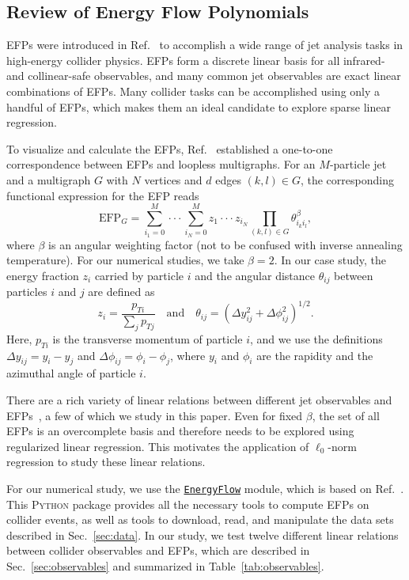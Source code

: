\documentclass[aps,prd,twocolumn, superscriptaddress,preprintnumbers, nofootinbib,longbibliography,floatfix]{revtex4-2}
\DeclareRobustCommand{\Sec}[1]{Sec.~\ref{#1}}
\DeclareRobustCommand{\Tab}[1]{Table~\ref{#1}}
\DeclareRobustCommand{\Ref}[1]{Ref.~\cite{#1}}
\begin{document}
\subsection{Review of Energy Flow Polynomials} \label{sec:EFPs}

EFPs were introduced in \Ref{Komiske:2017aww} to accomplish a wide range of jet analysis tasks in high-energy collider physics.
%
EFPs form a discrete linear basis for all infrared- and collinear-safe observables, and many common jet observables are exact linear combinations of EFPs.
% 
Many collider tasks can be accomplished using only a handful of EFPs, which makes them an ideal candidate to explore sparse linear regression. 


To visualize and calculate the EFPs, \Ref{Komiske:2017aww} established a one-to-one correspondence between EFPs and loopless multigraphs.
%
For an $M$-particle jet and a multigraph $G$ with $N$ vertices and $d$ edges $(k, l) \in G$, the corresponding functional expression for the EFP reads
%
\begin{equation}
	\text{EFP}_G = \sum_{i_1 = 0}^{M} \cdot \cdot \cdot \sum_{i_N = 0}^{M} z_1 \cdot \cdot \cdot z_{i_N} \prod_{(k, l) \in G} \theta_{i_k i_l}^\beta,
	\label{eq:EFP}
\end{equation}
%
where $\beta$ is an angular weighting factor (not to be confused with inverse annealing temperature).
%
For our numerical studies, we take $\beta = 2$.
%
In our case study, the energy fraction $z_i$ carried by particle $i$ and the angular distance $\theta_{ij}$ between particles $i$ and $j$ are defined as
%
\begin{equation}
	z_i = \frac{p_{Ti}}{\sum_j p_{Tj}} \quad \text{and}\quad \theta_{ij} = (\Delta y_{ij}^2 + \Delta \phi_{ij}^2)^{1 / 2}.
	\label{eq:ztheta}
\end{equation}
%
Here, $p_{Ti}$ is the transverse momentum of particle $i$, and we use the definitions $\Delta y_{ij} = y_i - y_j$ and $\Delta \phi_{ij} = \phi_i - \phi_j$, where $y_i$ and $\phi_i$ are the rapidity and the azimuthal angle of particle $i$. 


There are a rich variety of linear relations between different jet observables and EFPs~\cite{Komiske:2017aww,Komiske:2019asc}, a few of which we study in this paper.
%
Even for fixed $\beta$, the set of all EFPs is an overcomplete basis and therefore needs to be explored using regularized linear regression.
%
This motivates the application of $\ell_0$-norm regression to study these linear relations.


For our numerical study, we use the \href{https://pkomiske.github.io/EnergyFlow}{\tt EnergyFlow} module, which is based on \Ref{Komiske:2017aww}.
%
This \textsc{Python} package provides all the necessary tools to compute EFPs on collider events, as well as tools to download, read, and manipulate the data sets described in \Sec{sec:data}.
%
In our study, we test twelve different linear relations between collider observables and EFPs, which are described in \Sec{sec:observables} and summarized in \Tab{tab:observables}.
\end{document}
